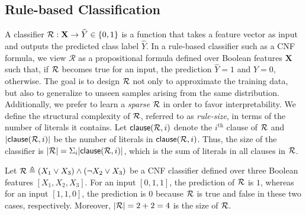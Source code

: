 
\subsection{Rule-based Classification}
A classifier $ {\mathcal{R}}: \mathbf{X} \rightarrow \widehat{Y} \in  \{0,1\} $ is a  function that takes a feature vector as input and outputs the predicted class label $\widehat{Y}$.  %
In a rule-based classifier such as a CNF formula, we view $ \mathcal{R} $ as a propositional formula defined over Boolean features $ \mathbf{X} $ such that, if $ {\mathcal{R}} $ becomes true for an input, the prediction $ \widehat{Y} = 1 $ and $ \widehat{Y} = 0 $, otherwise.  The goal is to design ${\mathcal{R}}$ not only to approximate the training data, but also to generalize to unseen samples arising from the same distribution. Additionally, we prefer to learn a \emph{sparse} $ {\mathcal{R}} $ in order to favor interpretability. We define the structural complexity of $ {\mathcal{R}} $, referred to as \emph{rule-size}, in terms of the number of literals it contains. Let $\mathsf{clause}({\mathcal{R}},i)$ denote  the  $i^\text{th}$ clause of ${\mathcal{R}}$ and $ |\mathsf{clause}({\mathcal{R}},i)| $ be  the number of literals in $\mathsf{clause}({\mathcal{R}},i)$. Thus, the size of the classifier is $|{\mathcal{R}}| =  \Sigma_i |\mathsf{clause}({\mathcal{R}},i)| $, which is the sum of literals in all clauses in $ {\mathcal{R}} $. 

\begin{example}
	\normalfont
	Let $ {\mathcal{R}} \triangleq (X_1 \vee X_3) \wedge (\neg X_2 \vee X_3) $ be a CNF classifier defined over three Boolean features $ [X_1, X_2, X_3] $. For an input $ [0, 1, 1] $, the prediction of $ {\mathcal{R}}  $ is $ 1 $, whereas for an input $ [1, 1, 0] $, the prediction is $ 0 $ because $ {\mathcal{R}} $ is true and false in these two cases, respectively. Moreover, $ |{\mathcal{R}}| = 2 + 2 = 4 $ is the size of $ {\mathcal{R}} $. 
\end{example}

